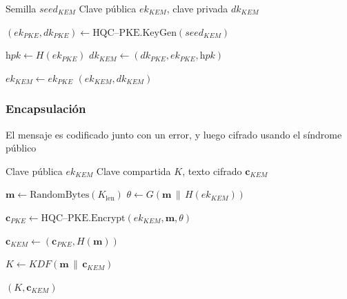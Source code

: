 \begin{tcolorbox}[hqcbox,title=\textbf{Algoritmo HQC–KEM.KeyGen}]
\begin{algorithmic}[1]
\Require Semilla $\textit{seed}_{KEM}$
\Ensure Clave pública $\textit{ek}_{KEM}$, clave privada $\textit{dk}_{KEM}$

\State $(\textit{ek}_{PKE}, \textit{dk}_{PKE}) \gets \text{HQC–PKE.KeyGen}(\textit{seed}_{KEM})$

\State $\textit{hpk} \gets H(\textit{ek}_{PKE})$
\State $\textit{dk}_{KEM} \gets (\textit{dk}_{PKE}, \textit{ek}_{PKE}, \textit{hpk})$

\State $\textit{ek}_{KEM} \gets \textit{ek}_{PKE}$
\State \Return $(\textit{ek}_{KEM}, \textit{dk}_{KEM})$
\end{algorithmic}
\end{tcolorbox}

\subsubsection{Encapsulación}
El mensaje es codificado junto con un error, y luego cifrado usando el síndrome público

\begin{tcolorbox}[hqcbox,title=\textbf{Algoritmo HQC–KEM.Encaps}]
\begin{algorithmic}[1]
\Require Clave pública $\textit{ek}_{KEM}$
\Ensure Clave compartida $K$, texto cifrado $\mathbf{c}_{KEM}$

\State $\mathbf{m} \gets \text{RandomBytes}(K_\text{len})$
\State $\theta \gets G(\mathbf{m} \,\|\, H(\textit{ek}_{KEM}))$

\State $\mathbf{c}_{PKE} \gets \text{HQC–PKE.Encrypt}(\textit{ek}_{KEM}, \mathbf{m}, \theta)$

\State $\mathbf{c}_{KEM} \gets (\mathbf{c}_{PKE}, H(\mathbf{m}))$

\State $K \gets KDF(\mathbf{m} \,\|\, \mathbf{c}_{KEM})$

\State \Return $(K, \mathbf{c}_{KEM})$
\end{algorithmic}
\end{tcolorbox}

